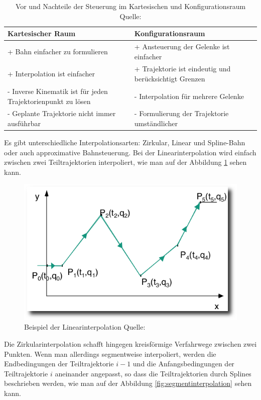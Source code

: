 \begin{table}[h]
		\centering
		\begin{tabular}{| p{7cm} | p{7cm}|}
\hline
\textbf{Kartesischer Raum} & \textbf{Konfigurationsraum}\\
\hline
+ Bahn einfacher zu formulieren & + Ansteuerung der Gelenke ist
einfacher\\
+ Interpolation ist einfacher & + Trajektorie ist eindeutig und
berücksichtigt Grenzen\\

- Inverse Kinematik ist für jeden Trajektorienpunkt zu lösen & - Interpolation für mehrere
Gelenke\\
- Geplante Trajektorie nicht immer ausführbar & - Formulierung der Trajektorie umständlicher\\
\hline
		\end{tabular}
		\caption{\label{fig:steurungProContra} Vor und Nachteile der Steuerung im Kartesischen und Konfigurationsraum Quelle: \citep{rob1}}
		\end{table}	
Es gibt unterschiedliche Interpolationsarten:
Zirkular, Linear und Spline-Bahn oder auch approximative Bahnsteuerung.
Bei der Linearinterpolation wird einfach zwischen zwei Teiltrajektorien interpoliert, wie man auf der Abbildung \ref{fig:linearinterpolation} sehen kann.
\begin{figure}[h]
	\center
	\includegraphics[scale=0.35]{graphics/linearinterpolation.png}
	\caption{\label{fig:linearinterpolation} Beispiel der Linearinterpolation Quelle: \citep{rob1}}
\end{figure}
Die Zirkularinterpolation schafft hingegen kreisförmige Verfahrwege zwischen zwei Punkten.
Wenn man allerdings segmentweise interpoliert, werden die Endbedingungen der Teiltrajektorie $i-1$ und die Anfangsbedingungen der Teiltrajektorie $i$ aneinander angepasst, so dass die Teiltrajektorien durch Splines beschrieben werden, wie man auf der Abbildung \ref{fig:segmentinterpolation} sehen kann.
